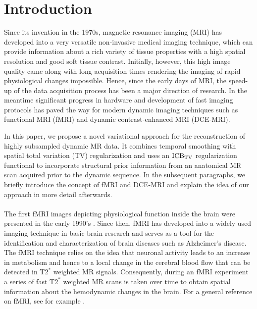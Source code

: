 \section{Introduction}
\label{sec:intro}
Since its invention in the 1970s, magnetic resonance imaging (MRI) has developed into a very versatile non-invasive medical imaging technique, which can provide information about a rich variety of tissue properties with a high spatial resolution and good soft tissue contrast. 
Initially, however, this high image quality came along with long acquisition times rendering the imaging of rapid physiological changes impossible. 
Hence, since the early days of MRI, the speed-up of the data acquisition process has been a major direction of research. 
In the meantime significant progress in hardware and development of fast imaging protocols has paved the way for modern dynamic imaging techniques such as functional MRI (fMRI) and dynamic contrast-enhanced MRI (DCE-MRI). 

In this paper, we propose a novel variational approach for the reconstruction of highly subsampled dynamic MR data. 
It combines temporal smoothing with spatial total variation (TV) regularization and uses an $\mathrm{ICB}_{\mathrm{TV}}$ regularization functional to incorporate structural prior information from an anatomical MR scan acquired prior to the dynamic sequence. 
In the subsequent paragraphs, we briefly introduce the concept of fMRI and DCE-MRI and explain the idea of our approach in more detail afterwards.\\

\\
\noindent
The first fMRI images depicting physiological function inside the brain were presented in the early 1990's \cite{ogawa90,ogawa92}. 
Since then, fMRI has developed into a widely used imaging technique in basic brain research and serves as a tool for the identification and characterization of brain diseases such as Alzheimer's disease.
The fMRI technique relies on the idea that neuronal activity leads to an increase in metabolism and hence to a local change in the cerebral blood flow that can be detected in T$2^*$ weighted MR signals. 
Consequently, during an fMRI experiment a series of fast T$2^*$ weighted MR scans is taken over time to obtain spatial information about the hemodynamic changes in the brain. For a general reference on fMRI, see for example \cite{fmribook}.\\

